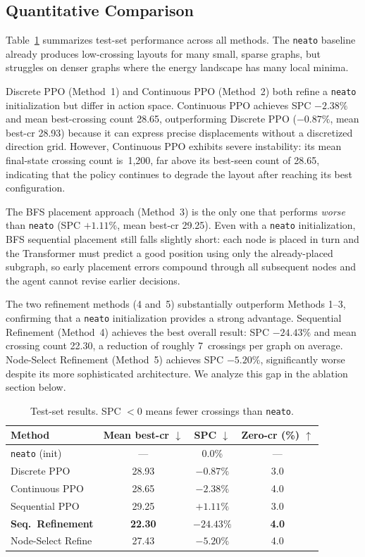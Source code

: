 \documentclass[10pt,twocolumn]{article}
\begin{document}
\subsection{Quantitative Comparison}

Table~\ref{tab:results} summarizes test-set performance across all methods.
The \texttt{neato} baseline already produces low-crossing layouts for many
small, sparse graphs, but struggles on denser graphs where the energy
landscape has many local minima.

Discrete PPO (Method~1) and Continuous PPO (Method~2) both refine a
\texttt{neato} initialization but differ in action space.  Continuous PPO
achieves SPC $-2.38\%$ and mean best-crossing count 28.65, outperforming
Discrete PPO ($-0.87\%$, mean best-cr 28.93) because it can express precise
displacements without a discretized direction grid.  However, Continuous PPO
exhibits severe instability: its mean final-state crossing count is~1{,}200,
far above its best-seen count of 28.65, indicating that the policy continues
to degrade the layout after reaching its best configuration.

The BFS placement approach (Method~3) is the only one that performs
\emph{worse} than \texttt{neato} (SPC $+1.11\%$, mean best-cr 29.25).
Even with a \texttt{neato} initialization, BFS sequential placement still
falls slightly short: each node is placed in turn and the Transformer must
predict a good position using only the already-placed subgraph, so
early placement errors compound through all subsequent nodes and the
agent cannot revise earlier decisions.

The two refinement methods (4 and~5) substantially outperform Methods 1--3,
confirming that a \texttt{neato} initialization provides a strong advantage.  Sequential Refinement
(Method~4) achieves the best overall result: SPC $-24.43\%$ and mean
crossing count 22.30, a reduction of roughly 7~crossings per graph on
average.  Node-Select Refinement (Method~5) achieves SPC $-5.20\%$,
significantly worse despite its more sophisticated architecture.  We
analyze this gap in the ablation section below.

\begin{table}[h]
\centering
\caption{Test-set results. SPC $<0$ means fewer crossings than \texttt{neato}.}
\label{tab:results}
\small
\begin{tabular}{lccc}
\toprule
Method & Mean best-cr $\downarrow$ & SPC $\downarrow$ & Zero-cr (\%) $\uparrow$ \\
\midrule
\texttt{neato} (init)             & ---   & 0.0\%     & ---  \\
Discrete PPO                      & 28.93 & $-0.87\%$ & 3.0  \\
Continuous PPO                    & 28.65 & $-2.38\%$ & 4.0  \\
Sequential PPO                    & 29.25 & $+1.11\%$ & 3.0  \\
\textbf{Seq.\ Refinement}         & \textbf{22.30} & $\mathbf{-24.43\%}$ & \textbf{4.0} \\
Node-Select Refine                & 27.43 & $-5.20\%$ & 4.0  \\
\bottomrule
\end{tabular}
\end{table}
\end{document}
